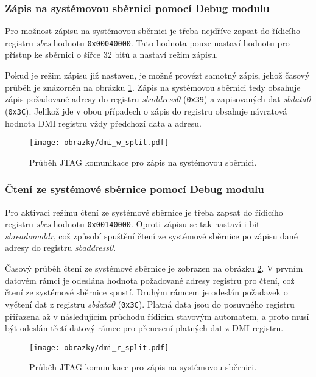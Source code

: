 \subsubsection{Zápis na systémovou sběrnici pomocí Debug modulu}
Pro možnost zápisu na systémovou sběrnici je třeba nejdříve zapsat do řídicího registru \textit{sbcs} hodnotu \texttt{0x00040000}. Tato hodnota pouze nastaví hodnotu pro přístup ke sběrnici o šířce 32 bitů a nastaví režim zápisu. \cite{risc-v_dbg}

Pokud je režim zápisu již nastaven, je možné provézt samotný zápis, jehož časový průběh je znázorněn na obrázku \ref{fig:dmi_w}. Zápis na systémovou sběrnici tedy obsahuje zápis požadované adresy do registru \textit{sbaddress0} (\texttt{0x39}) a zapisovaných dat \textit{sbdata0} (\texttt{0x3C}). Jelikož jde v obou případech o zápis do registru obsahuje návratová hodnota \acs{DMI} registru vždy předchozí data a adresu.
 
\begin{figure}[!h]
  \begin{center}
    \texttt{[image: obrazky/dmi\_w\_split.pdf]}
  \end{center}
  \caption{Průběh \acs{JTAG} komunikace pro zápis na systémovou sběrnici.}
	\label{fig:dmi_w}
\end{figure}

\subsubsection{Čtení ze systémové sběrnice pomocí Debug modulu}
Pro aktivaci režimu čtení ze systémové sběrnice je třeba zapsat do řídicího registru \textit{sbcs} hodnotu \texttt{0x00140000}. Oproti zápisu se tak nastaví i bit \textit{sbreadonaddr}, což způsobí spuštění čtení ze systémové sběrnice po zápisu dané adresy do registru \textit{sbaddress0}.

Časový průběh čtení ze systémové sběrnice je zobrazen na obrázku \ref{fig:dmi_r}. V prvním datovém rámci je odeslána hodnota požadované adresy registru pro čtení, což čtení ze systémové sběrnice spustí. Druhým rámcem je odeslán požadavek o vyčtení dat z registru \textit{sbdata0} (\texttt{0x3C}). Platná data jsou do posuvného registru přiřazena až v následujícím průchodu řídicím stavovým automatem, a proto musí být odeslán třetí datový rámec pro přenesení platných dat z \acs{DMI} registru.

\begin{figure}[!h]
  \begin{center}
    \texttt{[image: obrazky/dmi\_r\_split.pdf]}
  \end{center}
  \caption{Průběh \acs{JTAG} komunikace pro zápis na systémovou sběrnici.}
	\label{fig:dmi_r}
\end{figure}

